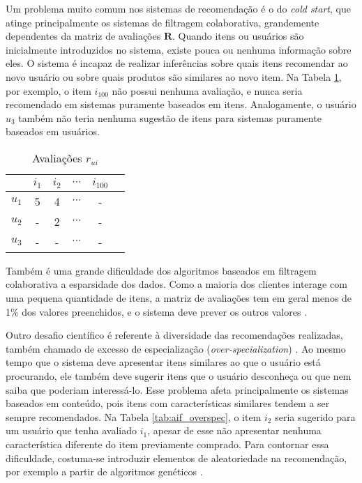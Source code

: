 Um problema muito comum nos sistemas de recomendação é o do \textit{cold start}, que atinge principalmente os sistemas de filtragem colaborativa, grandemente dependentes da matriz de avaliações $\mathbf{R}$. Quando itens ou usuários são inicialmente introduzidos no sistema, existe pouca ou nenhuma informação sobre eles. O sistema é incapaz de realizar inferências sobre quais itens recomendar ao novo usuário ou sobre quais produtos são similares ao novo item. Na Tabela \ref{tab:rui_cold_start}, por exemplo, o item $i_{100}$ não possui nenhuma avaliação, e nunca seria recomendado em sistemas puramente baseados em itens. Analogamente, o usuário $u_3$ também não teria nenhuma sugestão de itens para sistemas puramente baseados em usuários.

\begin{table}[h]
\begin{center}
    \caption{Avaliações $r_{ui}$}
    \label{tab:rui_cold_start}
    \begin{tabular}{ | c | c | c | c | c | c |} 
    \hline
     & $i_1$ & $i_2$ & $\cdots$ & $i_{100}$ \\ \hline
     $u_1$ & 5 & 4 & $\cdots$ & - \\ \hline
     $u_2$ & - & 2 & $\cdots$ & - \\ \hline
     $u_3$ & - & - & $\cdots$ & - \\ \hline
    \end{tabular}
\end{center}
\end{table}

Também é uma grande dificuldade dos algoritmos baseados em filtragem colaborativa a esparsidade dos dados. Como a maioria dos clientes interage  com uma pequena quantidade  de itens, a matriz de avaliações tem em geral menos de 1\%  dos valores preenchidos, e o sistema deve prever os outros valores \cite{fennell2009collaborative}. 

Outro desafio científico é referente à diversidade das recomendações realizadas, também chamado de excesso de especialização (\textit{over-specialization}) \cite{adomavicius2005toward}. Ao mesmo tempo que o sistema deve apresentar itens similares ao que o usuário está procurando, ele também deve sugerir itens que o usuário desconheça ou que nem saiba que poderiam interessá-lo. Esse problema afeta principalmente os sistemas baseados em conteúdo, pois itens com características similares tendem a ser sempre recomendados. Na Tabela \ref{tab:aif_overspec}, o item $i_2$ seria sugerido para um usuário que tenha avaliado $i_1$, apesar de esse não apresentar nenhuma característica diferente do item previamente comprado. Para contornar essa dificuldade, costuma-se introduzir elementos de aleatoriedade na recomendação, por exemplo a partir de algoritmos genéticos \cite{balabanovic97fab}. 


